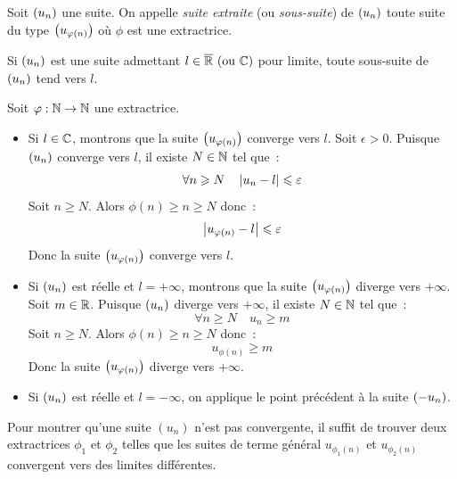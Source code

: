 \documentclass{magnolia}
\begin{document}
\begin{definition}[utile=-3]
Soit $\left(u_n\right)$ une suite. On appelle \emph{suite extraite} (ou \emph{sous-suite}) de
$\left(u_n\right)$ toute suite du type $\left(u_{\varphi(n)}\right)$ où $\phi$ est une extractrice.
\end{definition}

\begin{proposition}[utile=-3]
Si $\left(u_n\right)$ est une suite admettant $l\in\text{$\overline{\mathbb{R}}$ (ou $\mathbb{C}$)}$
pour limite, toute sous-suite de $\left(u_n\right)$ tend vers $l$. 
\end{proposition}



\begin{preuve}
Soit $\varphi:\mathbb{N}\to\mathbb{N}$ une extractrice.
\begin{itemize}
\item Si $l\in\mathbb{C}$, montrons que la suite $\left(u_{\varphi(n)}\right)$ converge vers $l$.
  Soit $\epsilon>0$. Puisque $\left(u_n\right)$ converge vers $l$, il existe $N\in\mathbb{N}$
  tel que~:
  \[\forall n\geqslant N \quad \left|u_n-l\right|\leqslant\varepsilon\]
  Soit $n\geq N$. Alors $\phi(n)\geq n\geq N$ donc~:
  \[\left|u_{\varphi(n)}-l\right|\leqslant\varepsilon\]
  Donc la suite $\left(u_{\varphi(n)}\right)$ converge vers $l$.
\item Si $\left(u_n\right)$ est réelle et $l=+\infty$, montrons que la suite
  $\left(u_{\varphi(n)}\right)$ diverge vers $+\infty$. Soit $m\in\mathbb{R}$. Puisque $\left(u_n\right)$
  diverge vers $+\infty$, il existe $N\in\mathbb{N}$ tel que~:
  \[\forall n\geq N \quad u_n\geq m\]
  Soit $n\geq N$. Alors $\phi(n)\geq n\geq N$ donc~:
  \[u_{\phi(n)}\geq m\]
  Donc la suite $\left(u_{\varphi(n)}\right)$ diverge vers $+\infty$.
\item Si $\left(u_n\right)$ est réelle et $l=-\infty$, on applique le point précédent
  à la suite $\left(-u_n\right)$.
\end{itemize}
\end{preuve}

\begin{remarqueUnique}
\remarque Pour montrer qu'une suite $(u_n)$ n'est pas convergente, il suffit
  de trouver deux extractrices $\phi_1$ et $\phi_2$ telles que les suites de
  terme général $u_{\phi_1(n)}$ et $u_{\phi_2(n)}$ convergent vers des limites
  différentes.
\end{remarqueUnique}
\end{document}
